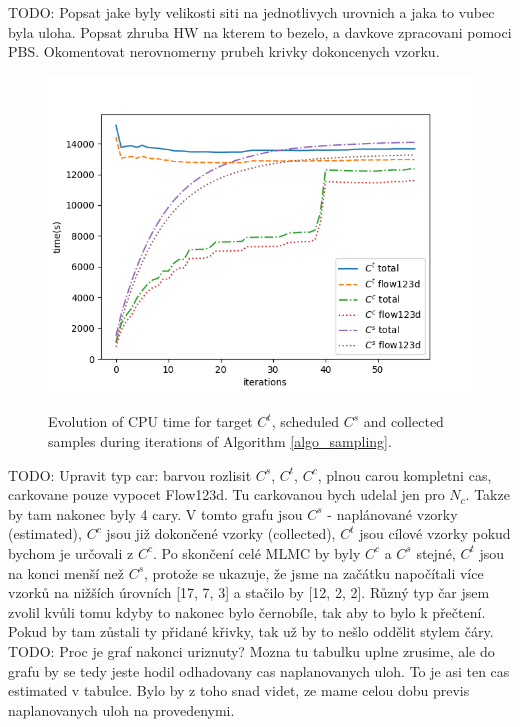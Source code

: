 \documentclass{article}
\def\todo#1{{\color{red}TODO: #1}}
\begin{document}
\todo{Popsat jake byly velikosti siti na jednotlivych urovnich a jaka to vubec byla uloha. Popsat zhruba HW na kterem to bezelo, a davkove zpracovani pomoci PBS. Okomentovat nerovnomerny prubeh krivky dokoncenych vzorku.}
\begin{figure}[H]
\centering
\includegraphics[width=\textwidth]{time_1.png}
\label{fig:n_l_time}
\caption{Evolution of CPU time for target $C^t$, scheduled $C^s$ and collected samples during iterations of Algorithm \ref{algo_sampling}.}
\end{figure}
\todo{Upravit typ car: barvou rozlisit $C^s$, $C^t$, $C^c$, plnou carou kompletni cas, carkovane pouze vypocet Flow123d. Tu carkovanou bych udelal jen pro $N_c$. Takze by tam nakonec byly 4 cary.}
V tomto grafu jsou $C^s$ - naplánované vzorky (estimated), $C^c$ jsou již dokončené vzorky (collected), $C^t$ jsou cílové vzorky pokud bychom je určovali z $C^c$. Po skončení celé MLMC by byly $C^c$ a $C^s$ stejné, $C^t$ jsou na konci menší než $C^s$, protože se ukazuje, že jsme na začátku napočítali více vzorků na nižších úrovních [17, 7, 3] a stačilo by [12, 2, 2]. Různý typ čar jsem zvolil kvůli tomu kdyby to nakonec bylo černobíle, tak aby to bylo k přečtení. Pokud by tam zůstali ty přidané křivky, tak už by to nešlo oddělit stylem čáry. 
\todo{Proc je graf nakonci uriznuty? Mozna tu tabulku uplne zrusime, ale do grafu by se tedy jeste hodil odhadovany cas naplanovanych uloh. To je asi ten cas estimated v tabulce.  Bylo by z toho snad videt, ze mame celou dobu previs naplanovanych uloh na provedenymi.}
\end{document}
